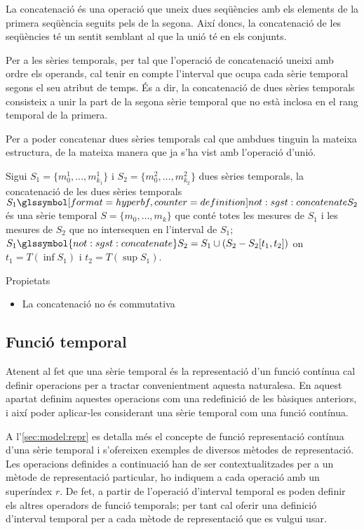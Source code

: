 La concatenació és una operació que uneix dues seqüències amb els
elements de la primera seqüència seguits pels de la segona. Així
doncs, la concatenació de les seqüències té un sentit semblant al que
la unió té en els conjunts. 

Per a les sèries temporals, per tal que l'operació de concatenació
uneixi amb ordre els operands, cal tenir en compte l'interval que
ocupa cada sèrie temporal segons el seu atribut de temps.  És a dir,
la concatenació de dues sèries temporals consisteix a unir la part de
la segona sèrie temporal que no està inclosa en el rang temporal de la
primera.

Per a poder concatenar dues sèries temporals cal que ambdues tinguin
la mateixa estructura, de la mateixa manera que ja s'ha vist amb
l'operació d'unió.


\begin{definition}[concatenació]
  Sigui $S_1=\{m_0^1, \dotsc, m_{k_1}^1\}$ i $S_2=\{m_0^2, \dotsc,
  m_{k_2}^2\}$ dues sèries temporals, la concatenació de les dues
  sèries temporals $S_1 \glssymboldef{not:sgst:concatenate} S_2$ és
  una sèrie temporal $S=\{m_0, \dotsc, m_k\}$ que conté totes les
  mesures de $S_1$ i les mesures de $S_2$ que no intersequen en
  l'interval de $S_1$; $S_1 \glssymbol{not:sgst:concatenate} S_2 = S_1
  \cup ( S_2 - S_2[t_1,t_2] )$ on $t_1=T(\inf S_1)$ i $t_2=T(\sup
  S_1)$.
\end{definition}


Propietats
\begin{itemize}
\item La concatenació no és commutativa
\end{itemize}







\subsection{Funció temporal}
\label{sec:sgst:operadors-temporals}

Atenent al fet que una sèrie temporal és la representació d'un funció
contínua cal definir operacions per a tractar convenientment aquesta
naturalesa.
En aquest apartat definim aquestes operacions com una redefinició de
les bàsiques anteriors, i així poder aplicar-les considerant una sèrie
temporal com una funció contínua.  


A l'\autoref{sec:model:repr} es detalla més el concepte de funció
representació contínua d'una sèrie temporal i s'ofereixen exemples de
diversos mètodes de representació. Les operacions definides a
continuació han de ser contextualitzades per a un mètode de
representació particular, ho indiquem a cada operació amb un
superíndex $r$. De fet, a partir de l'operació d'interval temporal es
poden definir els altres operadors de funció temporals; per tant cal
oferir una definició d'interval temporal per a cada mètode de
representació que es vulgui usar.




